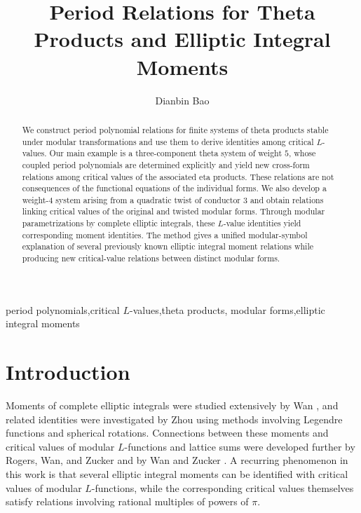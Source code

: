 \documentclass[preprint,12pt]{elsarticle}
\theoremstyle{definition}
\theoremstyle{remark}
\begin{document}
	\begin{frontmatter}
\title{\bfseries
	Period Relations for Theta Products and Elliptic Integral Moments
}

\author[temple]{Dianbin Bao}



	

\begin{abstract}
We construct period polynomial relations for finite systems of theta products stable under modular transformations and use them to derive identities among critical $L$-values. Our main example is a three-component theta system of weight $5$, whose coupled period polynomials are determined explicitly and yield new cross-form relations among critical values of the associated eta products. These relations are not consequences of the functional equations of the individual forms. We also develop a weight-$4$ system arising from a quadratic twist of conductor $3$ and obtain relations linking critical values of the original and twisted modular forms. Through modular parametrizations by complete elliptic integrals, these $L$-value identities yield corresponding moment identities. The method gives a unified modular-symbol explanation of several previously known elliptic integral moment relations while producing new critical-value relations between distinct modular forms.
\end{abstract}
	
\begin{keyword}period polynomials\sep critical $L$-values\sep theta products\sep
modular forms\sep elliptic integral moments
\end{keyword}


\end{frontmatter}
	\section{Introduction}
Moments of complete elliptic integrals were studied extensively by Wan
\cite{MR2845511}, and related identities were investigated by Zhou
\cite{MR3231318} using methods involving Legendre functions and spherical
rotations. Connections between these moments and critical values of modular $L$-functions
and lattice sums were developed further by Rogers, Wan, and Zucker
\cite{MR3338042} and by Wan and Zucker \cite{MR3490555}. A recurring
phenomenon in this work is that several elliptic integral moments can be
identified with critical values of modular $L$-functions, while the
corresponding critical values themselves satisfy relations involving rational
multiples of powers of $\pi$. 
\end{document}
